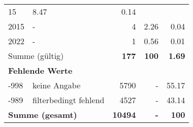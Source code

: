 \begin{longtable}{lXrrr}
       \num{15} &
       \num[round-mode=places,round-precision=2]{8.47} &
         \num[round-mode=places,round-precision=2]{0.14} \\

     2015 &
     \multicolumn{1}{X}{ -  } &


       \num{4} &
       \num[round-mode=places,round-precision=2]{2.26} &
         \num[round-mode=places,round-precision=2]{0.04} \\

     2022 &
     \multicolumn{1}{X}{ -  } &


       \num{1} &
       \num[round-mode=places,round-precision=2]{0.56} &
         \num[round-mode=places,round-precision=2]{0.01} \\
     \midrule
     \multicolumn{2}{l}{Summe (gültig)} &
       \textbf{\num{177}} &
     \textbf{\num{100}} &
       \textbf{\num[round-mode=places,round-precision=2]{1.69}} \\
     \multicolumn{5}{l}{\textbf{Fehlende Werte}}\\
       -998 &
       keine Angabe &
         \num{5790} &
        - &
         \num[round-mode=places,round-precision=2]{55.17} \\
       -989 &
       filterbedingt fehlend &
         \num{4527} &
        - &
         \num[round-mode=places,round-precision=2]{43.14} \\
     \midrule
     \multicolumn{2}{l}{\textbf{Summe (gesamt)}} &
          \textbf{\num{10494}} &
        \textbf{-} &
        \textbf{\num{100}} \\
     \bottomrule
     \end{longtable}
     
